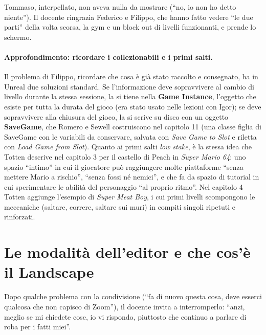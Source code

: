 Tommaso, interpellato, non aveva nulla da mostrare (``no, io non ho detto niente''). Il
docente ringrazia Federico e Filippo, che hanno fatto vedere ``le due parti'' della volta
scorsa, la gym e un block out di livelli funzionanti, e prende lo schermo.

\paragraph{Approfondimento: ricordare i collezionabili e i primi salti.} Il problema di
Filippo, ricordare che cosa è già stato raccolto e consegnato, ha in Unreal due soluzioni
standard. Se l'informazione deve sopravvivere al cambio di livello durante la stessa
sessione, la si tiene nella \textbf{Game Instance}, l'oggetto che esiste per tutta la durata
del gioco (era stato usato nelle lezioni con Igor); se deve sopravvivere alla chiusura del
gioco, la si scrive su disco con un oggetto \textbf{SaveGame}, che Romero e Sewell
costruiscono nel capitolo 11 (una classe figlia di SaveGame con le variabili da
conservare, salvata con \emph{Save Game to Slot} e riletta con \emph{Load Game from Slot}).
Quanto ai primi salti \emph{low stake}, è la stessa idea che Totten descrive nel capitolo 3
per il castello di Peach in \emph{Super Mario 64}: uno spazio ``intimo'' in cui il
giocatore può raggiungere molte piattaforme ``senza mettere Mario a rischio'', ``senza
fossi né nemici'', e che fa da spazio di tutorial in cui sperimentare le abilità del
personaggio ``al proprio ritmo''. Nel capitolo 4 Totten aggiunge l'esempio di \emph{Super
Meat Boy}, i cui primi livelli scompongono le meccaniche (saltare, correre, saltare sui
muri) in compiti singoli ripetuti e rinforzati.

\section{Le modalità dell'editor e che cos'è il Landscape}
\label{ue14:sec:modalita}

Dopo qualche problema con la condivisione (``fa di nuovo questa cosa, deve esserci
qualcosa che non capisco di Zoom''), il docente invita a interromperlo: ``anzi, meglio se mi
chiedete cose, io vi rispondo, piuttosto che continuo a parlare di roba per i fatti miei''.


